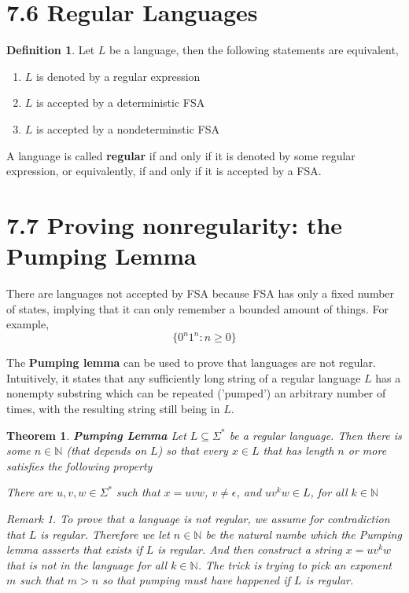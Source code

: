\documentclass[11pt]{article}
\theoremstyle{plain}%
\newtheorem{theorem}{Theorem}[section]
\theoremstyle{definition}
\newtheorem{defn}{Definition}
\theoremstyle{remark}
\newtheorem*{rem}{Remark}
\newcommand{\N}{\mathbb{N}}
\begin{document}
\section*{7.6 Regular Languages}

\begin{defn}
  Let $L$ be a language, then the following statements are equivalent,
  \begin{enumerate}
    \item $L$ is denoted by a regular expression
    \item $L$ is accepted by a deterministic FSA
    \item $L$ is accepted by a nondeterminstic FSA
  \end{enumerate}
  A language is called \textbf{regular} if and only if it is denoted by some regular expression, or equivalently, if and only if it is accepted by a FSA.
\end{defn}


\section*{7.7 Proving nonregularity:  the Pumping Lemma}

There are languages not accepted by FSA because FSA has only a fixed number of states, implying that it can only remember a bounded amount of things. For example,
\[
  \{ 0^n1^n: n\geq 0\}
\]

The \textbf{Pumping lemma} can be used to prove that languages are not regular. Intuitively, it states that any sufficiently long string of a regular language $L$ has a nonempty substring which can be repeated ('pumped') an arbitrary number of times, with the resulting string still being in $L$.

\begin{theorem}
  \textbf{Pumping Lemma} Let $L\subseteq \Sigma^*$ be a regular language. Then there is some $n\in\N$ (that depends on $L$) so that every $x\in L$ that has length $n$ or more satisfies the following property

  \begin{center}
    There are $u,v,w\in \Sigma^*$ such that $x=uvw$, $v\neq \epsilon$, and $uv^kw\in L$, for all $k\in\N$
  \end{center}

  \begin{rem}
    To prove that a language is not regular, we assume for contradiction that $L$ is regular. Therefore we let $n\in\N$ be the natural numbe which the Pumping lemma assserts that exists if $L$ is regular. And then construct a string $x = uv^kw$ that is not in the language for all $k\in\N$. The trick is trying to pick an exponent $m$ such that $m>n$ so that pumping must have happened if $L$ is regular.
  \end{rem}
\end{theorem}





\end{document}
